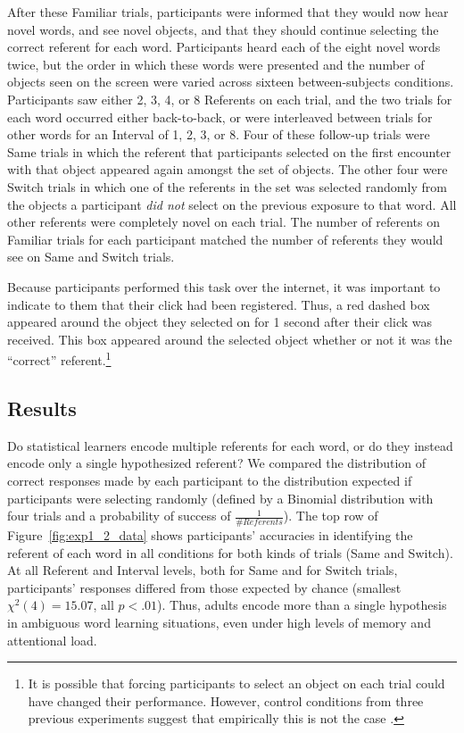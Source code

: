 \documentclass[man,floatsintext]{apa6}
\begin{document}
After these Familiar trials, participants were informed that they would now hear novel words, and see novel objects, and that they should continue selecting the correct referent for each word. Participants heard each of the eight novel words twice, but the order in which these words were presented and the number of objects seen on the screen were varied across sixteen between-subjects conditions. Participants saw either 2, 3, 4, or 8 Referents on each trial, and the two trials for each word occurred either back-to-back, or were interleaved between trials for other words for an Interval of 1, 2, 3, or 8. Four of these follow-up trials were Same trials in which the referent that participants selected on the first encounter with that object appeared again amongst the set of objects. The other four were Switch trials in which one of the referents in the set was selected randomly from the objects a participant \emph{did not} select on the previous exposure to that word. All other referents were completely novel on each trial. The number of referents on Familiar trials for each participant matched the number of referents they would see on Same and Switch trials.

Because participants performed this task over the internet, it was important to indicate to them that their click had been registered. Thus, a red dashed box appeared around the object they selected on for 1 second after their click was received. This box appeared around the selected object whether or not it was the ``correct'' referent.\footnote{It is possible that forcing participants to select an object on each trial could have changed their performance. However, control conditions from three previous experiments suggest that empirically this is not the case \cite{Medina2011, Smith2011a, Trueswell2013}.}

\subsection{Results}

Do statistical learners encode multiple referents for each word, or do they instead encode only a single hypothesized referent? We compared the distribution of correct responses made by each participant to the distribution expected if participants were selecting randomly (defined by a Binomial distribution with four trials and a probability of success of  $\frac{1}{\#Referents}$). The top row of Figure~\ref{fig:exp1_2_data} shows participants' accuracies in identifying the referent of each word in all conditions for both kinds of trials (Same and Switch). At all Referent and Interval levels, both for Same and for Switch trials, participants' responses differed from those expected by chance (smallest $\chi^{2}(4) = 15.07$, all $p < .01$). Thus, adults encode more than a single hypothesis in ambiguous word learning situations, even under high levels of memory and attentional load. 
\end{document}
